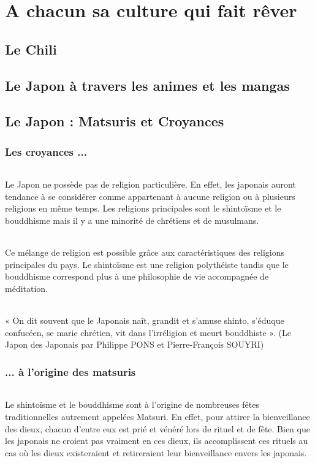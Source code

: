 \part{A chacun sa culture qui fait rêver}
\chapter{Le Chili}

\chapter{Le Japon à travers les animes et les mangas}

\chapter{Le Japon : Matsuris et Croyances}
\section{Les croyances ...}
\paragraph{}
Le Japon ne possède pas de religion particulière. En effet, les japonais auront tendance à se considérer comme appartenant à aucune religion ou à plusieurs religions en même temps. Les religions principales sont le shintoïsme et le bouddhisme mais il y a une minorité de chrétiens et de musulmans. 
\paragraph{}
Ce mélange de religion est possible grâce aux caractéristiques des religions principales du pays. Le shintoïsme est une religion polythéiste tandis que le bouddhisme correspond plus à une philosophie de vie accompagnée de méditation.
\paragraph{}
« On dit souvent que le Japonais naît, grandit et s’amuse shinto, s’éduque confucéen, se marie chrétien, vit dans l’irréligion et meurt bouddhiste ». (Le Japon des Japonais par Philippe PONS et Pierre-François SOUYRI)

\section{... à l'origine des matsuris}
\paragraph{}
Le shintoïsme et le bouddhisme sont à l’origine de nombreuses fêtes traditionnelles autrement appelées Matsuri. En effet, pour attirer la bienveillance des dieux, chacun d’entre eux est prié et vénéré lors de rituel et de fête. Bien que les japonais ne croient pas vraiment en ces dieux, ils accomplissent ces rituels au cas où les dieux existeraient et retireraient leur bienveillance envers les japonais.
